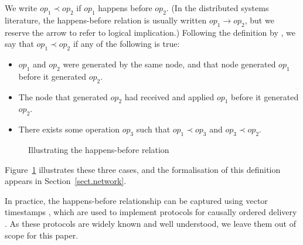 We write $\mathit{op}_1 \prec \mathit{op}_2$ if $\mathit{op}_1$ happens before $\mathit{op}_2$. (In
the distributed systems literature, the happens-before relation is usually written
$\mathit{op}_1 \longrightarrow \mathit{op}_2$, but we reserve the arrow to refer to logical
implication.) Following the definition by \citet{Lamport:1978jq}, we say that
$\mathit{op}_1 \prec \mathit{op}_2$ if any of the following is true:

\begin{itemize}
\item $\mathit{op}_1$ and $\mathit{op}_2$ were generated by the same node, and that node generated
    $\mathit{op}_1$ before it generated $\mathit{op}_2$.
\item The node that generated $\mathit{op}_2$ had received and applied $\mathit{op}_1$ before it
    generated $\mathit{op}_2$.
\item There exists some operation $\mathit{op}_3$ such that
    $\mathit{op}_1 \prec \mathit{op}_3$ and $\mathit{op}_3 \prec \mathit{op}_2$.
\end{itemize}

\begin{figure}
\centering

\caption{Illustrating the happens-before relation}\label{fig.happens-before}
\end{figure}

Figure~\ref{fig.happens-before} illustrates these three cases, and the formalisation of this
definition appears in Section~\ref{sect.network}.

In practice, the happens-before relationship can be captured using vector timestamps
\cite{Schwarz:1994gl,Fidge:1988tv,Raynal:1996jl}, which are used to implement protocols for causally
ordered delivery \cite{Cachin:2011wt}. As these protocols are widely known and well understood, we
leave them out of scope for this paper.








